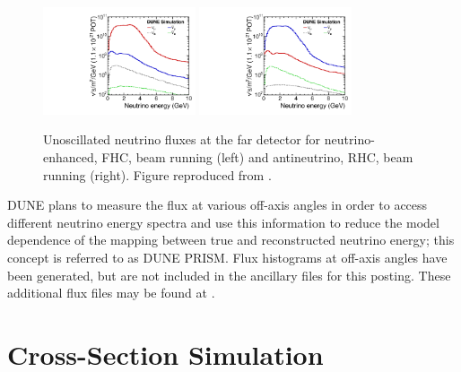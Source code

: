 \documentclass[aps,prd,superscriptaddress]{revtex4-1}
\begin{document}
\begin{figure}[!htpb]
  \centering
  \includegraphics[width=0.4\textwidth]{dune_flux_FD_FHC.pdf}
  \includegraphics[width=0.4\textwidth]{dune_flux_FD_RHC.pdf}
  \caption{Unoscillated neutrino fluxes at the far detector for neutrino-enhanced, FHC, beam running (left)
    and antineutrino,
    RHC, beam running (right). Figure reproduced from \cite{Abi:2020qib}.}
  \label{fig:beam_flux}
\end{figure}

DUNE plans to measure the flux at various off-axis angles in order to access different neutrino
energy spectra and use this information to reduce the model dependence of the mapping between true
and reconstructed neutrino energy; this concept is referred to as
DUNE PRISM. Flux histograms at off-axis angles have been generated, but are not included in the ancillary
files for this posting. These additional flux files may be found at \cite{lauraspage}.

\section{Cross-Section Simulation}
\label{sect:xsec}
\end{document}
